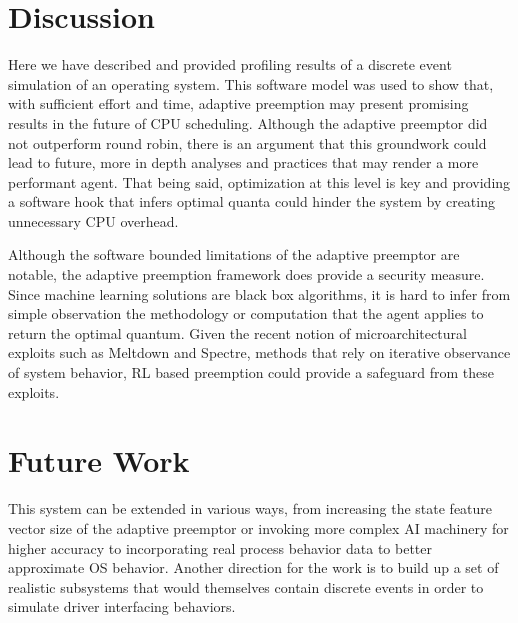 \documentclass{article}
\begin{document}
\section*{Discussion}
Here we have described and provided profiling results of a discrete event simulation of an operating system.
This software model was used to show that, with sufficient effort and time, adaptive preemption may
present promising results in the future of CPU scheduling. Although the adaptive preemptor did not 
outperform round robin, there is an argument that this groundwork could lead to future, more in depth analyses
and practices that may render a more performant agent.
That being said, optimization at this level is key and providing a software hook that infers optimal quanta could 
hinder the system by creating unnecessary CPU overhead.
\par
Although the software bounded limitations of the adaptive preemptor are notable, the adaptive preemption framework
does provide a security measure. Since machine learning solutions are black box algorithms, it is hard to infer from
simple observation the methodology or computation that the agent applies to return the optimal quantum. Given the
recent notion of microarchitectural exploits such as Meltdown and Spectre, methods that rely on iterative observance
of system behavior, RL based preemption could provide a safeguard from these exploits.
\section*{Future Work}
This system can be extended in various ways, from increasing the state feature vector size of the
adaptive preemptor or invoking more complex AI machinery for higher accuracy to incorporating
real process behavior data to better approximate OS behavior. Another direction for the work
is to build up a set of realistic subsystems that would themselves contain discrete events in
order to simulate driver interfacing behaviors.
\end{document}
